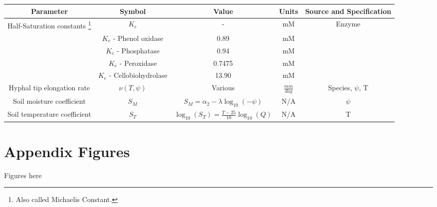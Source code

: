 \documentclass[12pt]{article}
\begin{document}
\begin{savenotes}
	\begin{table}[H]
		\begin{center}
			\begin{adjustbox}{width=1\textwidth}
			\begin{tabular}{|c c c c c|} 
				\hline
				Parameter & Symbol & Value & Units & Source and Specification \\
				\hline\hline
				Half-Saturation constants \footnote{Also called Michaelis Constant.} & $K_e$ & - & mM &  Enzyme \\ 
				& $K_e$ - Phenol oxidase & 0.89 & mM &  \cite{Davidson2012}\\
				& $K_e$ - Phosphatase & 0.94 & mM &  \cite{Nannipieri2011}\\
				& $K_e$ - Peroxidase & 0.7475 & mM &  \cite{Chance1943}\\
				& $K_e$ - Cellobiohydrolase & 13.90 & mM &  \cite{Razavi2015}\\
				\hline
				Hyphal tip elongation rate& $\nu(T,\psi)$& Various & $\frac{mm}{day}$ & \cite{Maynard2019} Species, $\psi$, T\\
				\hline
				Soil moisture coefficient & $S_M$ & $S_M = \alpha_2 -\lambda \log_{10}(-\psi)$ & N/A &\cite{Moorhead1991} $\psi$\\ %
				\hline
				Soil temperature coefficient & $S_T$ & $\log_{10}(S_T) = \frac{T-25}{10}\log_{10}(Q)$ & N/A &\cite{Moorhead1991} T\\ 
				\hline
			\end{tabular}
			\end{adjustbox}
		\vspace*{-3ex}
		\label{table5}
		\end{center}
	\end{table}
\end{savenotes}

\section{Appendix Figures}

Figures here

\newpage
\printbibliography
\end{document}
